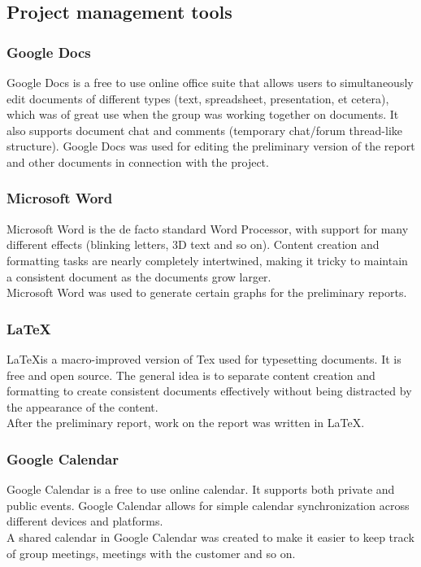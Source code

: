 \subsection{Project management tools}
\subsubsection{Google Docs}
Google Docs is a free to use online office suite that allows users to simultaneously edit documents of different types (text, spreadsheet, presentation, et cetera), which was of great use when the group was working together on documents. It also supports document chat and comments (temporary chat/forum thread-like structure). Google Docs was used for editing the preliminary version of the report and other documents in connection with the project.

\subsubsection{Microsoft Word}
Microsoft Word is the de facto standard Word Processor, with support for many different effects (blinking letters, 3D text and so on). Content creation and formatting tasks are nearly completely intertwined, making it tricky to maintain a consistent document as the documents grow larger.\\
Microsoft Word was used to generate certain graphs for the preliminary reports.

\subsubsection{\LaTeX}
\LaTeX is a macro-improved version of Tex used for typesetting documents. It is free and open source. The general idea is to separate content creation and formatting to create consistent documents effectively without being distracted by the appearance of the content.\\
After the preliminary report, work on the report was written in \LaTeX.

\subsubsection{Google Calendar}
Google Calendar is a free to use online calendar. It supports both private and public events. Google Calendar allows for simple calendar synchronization across different devices and platforms.\\
A shared calendar in Google Calendar was created to make it easier to keep track of group meetings, meetings with the customer and so on.

